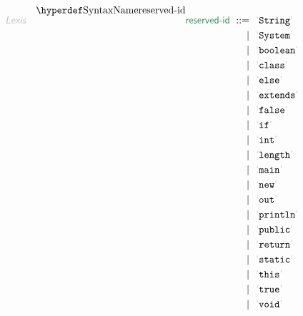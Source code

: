 \begin{align*}
  \KEY{Lexis} \quad
     \SYNDECL{reserved-id}
      \ ::= \ & \
      \LEX{String} \\
      \ \mid \ & \ \LEX{System} \\
      \ \mid \ & \ \LEX{boolean} \\
      \ \mid \ & \ \LEX{class} \\
      \ \mid \ & \ \LEX{else} \\
      \ \mid \ & \ \LEX{extends} \\
      \ \mid \ & \ \LEX{false} \\
      \ \mid \ & \ \LEX{if} \\
      \ \mid \ & \ \LEX{int} \\
      \ \mid \ & \ \LEX{length} \\
      \ \mid \ & \ \LEX{main} \\
      \ \mid \ & \ \LEX{new} \\
      \ \mid \ & \ \LEX{out} \\
      \ \mid \ & \ \LEX{println} \\
      \ \mid \ & \ \LEX{public} \\
      \ \mid \ & \ \LEX{return} \\
      \ \mid \ & \ \LEX{static} \\
      \ \mid \ & \ \LEX{this} \\
      \ \mid \ & \ \LEX{true} \\
      \ \mid \ & \ \LEX{void}
\end{align*}


